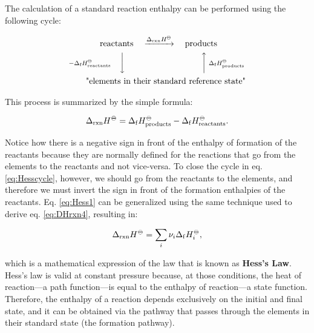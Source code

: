 \documentclass[
  9pt,
]{extbook}
\theoremstyle{definition}
\theoremstyle{definition}
\theoremstyle{definition}
\theoremstyle{remark}
\begin{document}
The calculation of a standard reaction enthalpy can be performed using the following cycle:

\begin{equation}
\begin{aligned}
 \text{reactants} & \quad \xrightarrow{\Delta_{\text{rxn}} H^{-\kern-6pt{\ominus}\kern-6pt-}} \quad \text{products} \\
\scriptstyle{-\Delta_{\text{f}} H_{\text{reactants}}^{-\kern-6pt{\ominus}\kern-6pt-}} \quad \bigg\downarrow \quad & \qquad \qquad \qquad \qquad \scriptstyle{\bigg\uparrow  \; \Delta_{\text{f}} H_{\text{products}}^{-\kern-6pt{\ominus}\kern-6pt-}} \\
 \text{"elements in } & \text{their standard reference state"}
\end{aligned}
\label{eq:Hesscycle}
\end{equation}

This process is summarized by the simple formula:

\begin{equation}
  \Delta_{\text{rxn}} H^{-\kern-6pt{\ominus}\kern-6pt-}= \Delta_{\mathrm{f}} H_{\text{products}}^{-\kern-6pt{\ominus}\kern-6pt-}- \Delta_{\mathrm{f}} H_{\text{reactants}}^{-\kern-6pt{\ominus}\kern-6pt-}.
  \label{eq:Hess1}
\end{equation}

Notice how there is a negative sign in front of the enthalpy of formation of the reactants because they are normally defined for the reactions that go from the elements to the reactants and not vice-versa. To close the cycle in eq. \eqref{eq:Hesscycle}, however, we should go from the reactants to the elements, and therefore we must invert the sign in front of the formation enthalpies of the reactants. Eq. \eqref{eq:Hess1} can be generalized using the same technique used to derive eq. \eqref{eq:DHrxn4}, resulting in:

\begin{equation}
  \Delta_{\text{rxn}} H^{-\kern-6pt{\ominus}\kern-6pt-}= \sum_i \nu_i \Delta_{\mathrm{f}} H_i^{-\kern-6pt{\ominus}\kern-6pt-},
  \label{eq:Hess}
\end{equation}

which is a mathematical expression of the law that is known as \textbf{Hess's Law}. Hess's law is valid at constant pressure because, at those conditions, the heat of reaction---a path function---is equal to the enthalpy of reaction---a state function. Therefore, the enthalpy of a reaction depends exclusively on the initial and final state, and it can be obtained via the pathway that passes through the elements in their standard state (the formation pathway).
\end{document}
